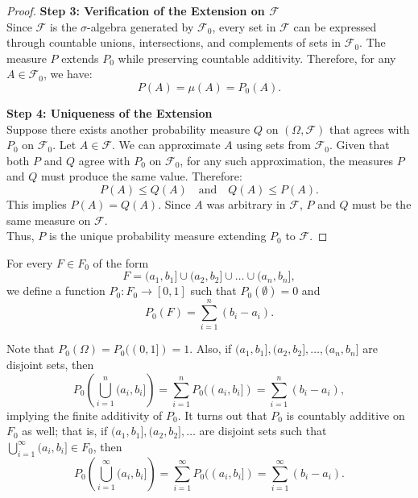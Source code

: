 \begin{proof}
    \textbf{Step 3: Verification of the Extension on \( \mathcal{F} \)}\\
    
    Since \( \mathcal{F} \) is the \( \sigma \)-algebra generated by \( \mathcal{F}_0 \), every set in \( \mathcal{F} \) can be expressed through countable unions, intersections, and complements of sets in \( \mathcal{F}_0 \). The measure \( P \) extends \( P_0 \) while preserving countable additivity. Therefore, for any \( A \in \mathcal{F}_0 \), we have:
    \[
    P(A) = \mu(A) = P_0(A).
    \]
    
    \textbf{Step 4: Uniqueness of the Extension}\\
    
    Suppose there exists another probability measure \( Q \) on \( (\Omega, \mathcal{F}) \) that agrees with \( P_0 \) on \( \mathcal{F}_0 \). Let \( A \in \mathcal{F} \). We can approximate \( A \) using sets from \( \mathcal{F}_0 \). Given that both \( P \) and \( Q \) agree with \( P_0 \) on \( \mathcal{F}_0 \), for any such approximation, the measures \( P \) and \( Q \) must produce the same value. Therefore:
    \[
    P(A) \leq Q(A) \quad \text{and} \quad Q(A) \leq P(A).
    \]
    This implies \( P(A) = Q(A) \). Since \( A \) was arbitrary in \( \mathcal{F} \), \( P \) and \( Q \) must be the same measure on \( \mathcal{F} \).\\
    
    Thus, \( P \) is the unique probability measure extending \( P_0 \) to \( \mathcal{F} \).
    
    \end{proof}

    For every $F \in F_0$ of the form
    \[
    F = (a_1, b_1] \cup (a_2, b_2] \cup \dots \cup (a_n, b_n],
    \]
    we define a function $P_0 : F_0 \rightarrow [0, 1]$ such that $P_0 (\emptyset) = 0$ and 
    \[
    P_0 (F) = \sum_{i=1}^{n} (b_i - a_i).
    \]
    
    Note that $P_0 (\Omega) = P_0 ((0, 1]) = 1$. Also, if $(a_1, b_1], (a_2, b_2], \dots, (a_n, b_n]$ are disjoint sets, then
    \[
    P_0 \left(\bigcup_{i=1}^{n} (a_i, b_i]\right) = \sum_{i=1}^{n} P_0 ((a_i, b_i]) = \sum_{i=1}^{n} (b_i - a_i),
    \]
    implying the finite additivity of $P_0$. It turns out that $P_0$ is countably additive on $F_0$ as well; that is, if $(a_1, b_1], (a_2, b_2], \dots$ are disjoint sets such that $\bigcup_{i=1}^{\infty} (a_i, b_i] \in F_0$, then
    \[
    P_0 \left(\bigcup_{i=1}^{\infty} (a_i, b_i]\right) = \sum_{i=1}^{\infty} P_0 ((a_i, b_i]) = \sum_{i=1}^{\infty} (b_i - a_i).
    \]
    
